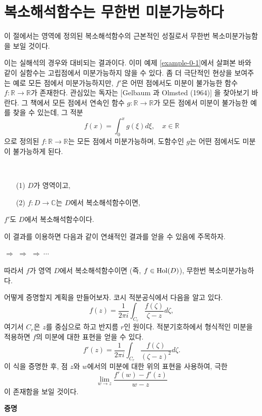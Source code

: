 \section{복소해석함수는 무한번 미분가능하다}

이 절에서는 영역에 정의된 복소해석함수의 근본적인 성질로서 
무한번 복소미분가능함을 보일 것이다.

이는 실해석의 경우와 대비되는 결과이다.
이미 예제 \ref{example-0-1}에서 살펴본 바와 같이
실함수는 고립점에서 미분가능하지 않을 수 있다.
좀 더 극단적인 현상을 보여주는 예로 
모든 점에서 미분가능하지만, $f'$은 어떤 점에서도 미분이 불가능한 
함수 $f:\mathbb R\to \mathbb R$가 존재한다.
관심있는 독자는 [Gelbaum 과 Olmsted (1964)] %
을 찾아보기 바란다.
그 책에서 모든 점에서 연속인 함수 $g:\mathbb R\to \mathbb R$가 
모든 점에서 미분이 불가능한 예를 찾을 수 있는데,
그 적분
\[
f(x) = \int_0^x g(\xi)d\xi, \quad x\in \mathbb R
\]
으로 정의된 $f:\mathbb R\to \mathbb R$는 모든 점에서 미분가능하며,
도함수인 $g$는 어떤 점에서도 미분이 불가능하게 된다.

\begin{salt_corollary} \label{coro-3-6}
\
\begin{itemize}
\item[(1)] $D$가 영역이고,
\item[(2)] $f:D\to\mathbb C$는 $D$에서 복소해석함수이면,
\end{itemize}
$f'$도 $D$에서 복소해석함수이다.
\end{salt_corollary}

이 결과를 이용하면 다음과 같이 연쇄적인 결과를 얻을 수 있음에 주목하자.
\begin{center}
 $\Rightarrow$  $\Rightarrow$
\fbox{$f''\in \Hol(D)$} $\Rightarrow \ \cdots$ 
\end{center}
따라서 $f$가 영역  $D$에서 복소해석함수이면 (즉, $f\in \mathop{\mathrm{Hol}}(D)$),
무한번 복소미분가능하다.

어떻게 증명할지 계획을 만들어보자.
코시 적분공식에서 다음을 알고 있다.
\[
f(z) = \dfrac1{2\pi i} \int_{C_r} \dfrac{f(\zeta)}{\zeta - z} d\zeta,
\]
여기서 $C_r$은 $z$를 중심으로 하고 반지름 $r$인 원이다.
적분기호하에서 형식적인 미분을 적용하면
$f$의 미분에 대한 표현을 얻을 수 있다.
\[
f'(z) = \dfrac1{2\pi i} \int_{C_r} \dfrac{f(\zeta)}{(\zeta - z)^2} d\zeta.
\]
이 식을 증명한 후, 점 $z$와 $w$에서의 미분에 대한 위의 표현을 사용하여, 극한
\[
\lim_{w\to z}\dfrac{f'(w)-f'(z)}{w-z}
\]
이 존재함을 보일 것이다.

{\bf 증명}

